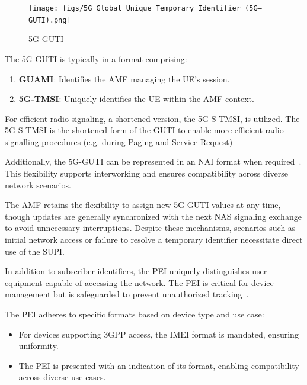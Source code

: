 \begin{figure}
    \centering
    \texttt{[image: figs/5G Global Unique Temporary Identifier (5G–GUTI).png]}
    \caption{\acs{5G-GUTI}}
    \label{fig:5G Global Unique Temporary Identifier (5G–GUTI)}
\end{figure}

The \ac{5G-GUTI} is typically in a format comprising:

\begin{enumerate}
    \item {
        \textbf{\ac{GUAMI}}: Identifies the \ac{AMF} managing the \ac{UE}'s session.
    }
    \item {
        \textbf{\ac{5G-TMSI}}: Uniquely identifies the \ac{UE} within the \ac{AMF} context.
    }
\end{enumerate}

For efficient radio signaling, a shortened version, the \ac{5G-S-TMSI}, is utilized. The \ac{5G-S-TMSI} is the shortened form of the \ac{GUTI} to enable more efficient radio signalling procedures (e.g. during Paging and Service Request)

Additionally, the \ac{5G-GUTI} can be represented in an \ac{NAI} format when required~\cite{23.003-p29}. This flexibility supports interworking and ensures compatibility across diverse network scenarios.

The \ac{AMF} retains the flexibility to assign new \ac{5G-GUTI} values at any time, though updates are generally synchronized with the next \ac{NAS} signaling exchange to avoid unnecessary interruptions. Despite these mechanisms, scenarios such as initial network access or failure to resolve a temporary identifier necessitate direct use of the \ac{SUPI}.

In addition to subscriber identifiers, the \ac{PEI} uniquely distinguishes user equipment capable of accessing the network. The \ac{PEI} is critical for device management but is safeguarded to prevent unauthorized tracking~\cite{23.501-p243}.

The \ac{PEI} adheres to specific formats based on device type and use case:
\begin{itemize}
    \item {
        For devices supporting \ac{3GPP} access, the \ac{IMEI} format is mandated, ensuring uniformity.
    }
    \item {
        The \ac{PEI} is presented with an indication of its format, enabling compatibility across diverse use cases.
    }
\end{itemize}

